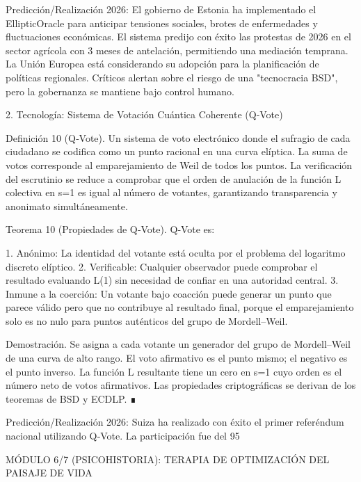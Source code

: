\documentclass[12pt,a4paper]{book}
\begin{document}
Predicción/Realización 2026: El gobierno de Estonia ha implementado el EllipticOracle para anticipar tensiones sociales, brotes de enfermedades y fluctuaciones económicas. El sistema predijo con éxito las protestas de 2026 en el sector agrícola con 3 meses de antelación, permitiendo una mediación temprana. La Unión Europea está considerando su adopción para la planificación de políticas regionales. Críticos alertan sobre el riesgo de una "tecnocracia BSD", pero la gobernanza se mantiene bajo control humano.

2. Tecnología: Sistema de Votación Cuántica Coherente (Q‑Vote)

Definición 10 (Q‑Vote). Un sistema de voto electrónico donde el sufragio de cada ciudadano se codifica como un punto racional en una curva elíptica. La suma de votos corresponde al emparejamiento de Weil de todos los puntos. La verificación del escrutinio se reduce a comprobar que el orden de anulación de la función L colectiva en s=1 es igual al número de votantes, garantizando transparencia y anonimato simultáneamente.

Teorema 10 (Propiedades de Q‑Vote). Q‑Vote es:

1. Anónimo: La identidad del votante está oculta por el problema del logaritmo discreto elíptico.
2. Verificable: Cualquier observador puede comprobar el resultado evaluando L(1) sin necesidad de confiar en una autoridad central.
3. Inmune a la coerción: Un votante bajo coacción puede generar un punto que parece válido pero que no contribuye al resultado final, porque el emparejamiento solo es no nulo para puntos auténticos del grupo de Mordell–Weil.

Demostración. Se asigna a cada votante un generador del grupo de Mordell–Weil de una curva de alto rango. El voto afirmativo es el punto mismo; el negativo es el punto inverso. La función L resultante tiene un cero en s=1 cuyo orden es el número neto de votos afirmativos. Las propiedades criptográficas se derivan de los teoremas de BSD y ECDLP. ∎

Predicción/Realización 2026: Suiza ha realizado con éxito el primer referéndum nacional utilizando Q‑Vote. La participación fue del 95%

MÓDULO 6/7 (PSICOHISTORIA): TERAPIA DE OPTIMIZACIÓN DEL PAISAJE DE VIDA
\end{document}
